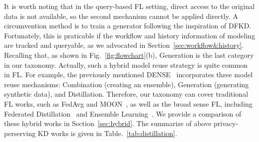 It is worth noting that in the query-based FL setting, direct access to the original data is not available, so the second mechanism cannot be applied directly. 
A circumvention method is to train a generator following the inspiration of DFKD. 
Fortunately, this is praticable if the workflow and history information of modeling are tracked and queryable, as we advocated in Section~\ref{sec:workflow&history}.
Recalling that, as shown in Fig.~\ref{fig:flowchart}(b), Generation is the last category in our taxonomy.
Actually, such a hybrid model reuse strategy is quite common in FL. 
For example, the previously mentioned DENSE~\cite{zhang2022dense} incorporates three model reuse mechanisms: Combination (creating an ensemble), Generation (generating synthetic data), and Distillation.
Therefore, our taxonomy can cover traditional FL works, such as FedAvg and MOON~\cite{li2021model}, as well as the broad sense FL, including Federated Distillation~\cite{jeong2018communication, jin2023feddyn} and Ensemble Learning~\cite{shi2023fed, wang2023data}.
We provide a comparison of these hybrid works in Section~\ref{sec:hybrid}. 
The summarize of above privacy-perserving KD works is given in Table.~\ref{tab:distillation}.



